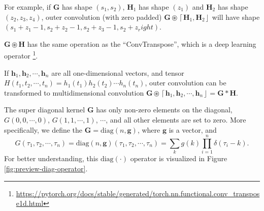 \documentclass[twoside,11pt]{article}
\def\oconv{\circledast}
\def\diag{\text{diag}}
\def\tvar#1{\mathbf{#1}} %
\def\lcerfl#1{\left\lceil{#1}\right\rfloor}
\begin{document}
For example, if \(\tvar{G}\) has shape \((s_1, s_2)\), \(\tvar{H}_1\) has shape \((z_1)\) and \(\tvar{H}_2\) has shape \((z_2, z_3, z_4)\), outer convolution (with zero padded) \(\tvar{G} \oconv \lcerfl{\tvar{H}_1, \tvar{H}_2}\) will have shape
\(( s_1 + z_1 - 1, s_2 + z_2 - 1, s_2 + z_3 - 1, s_2 + z_right)\).

\begin{remark}
  \(\tvar{G} \oconv \tvar{H}\) has the same operation as the ``ConvTranspose'', which is a deep learning operator \footnote{\url{https://pytorch.org/docs/stable/generated/torch.nn.functional.conv_transpose1d.html}}.
\end{remark}

\begin{remark}
  If \(\tvar{h}_1, \tvar{h}_2, \cdots, \tvar{h}_n\) are all one-dimensional vectors, and tensor \(H(t_1, t_2, \cdots, t_n) = h_1(t_1) h_2(t_2) \cdots h_n(t_n)\), outer convolution can be transformed to multidimensional convolution \(\tvar{G} \oconv \lcerfl{\tvar{h}_1, \tvar{h}_2, \cdots, \tvar{h}_n} = \tvar{G} * \tvar{H}\).
\end{remark}


The super diagonal kernel \(\tvar{G}\) has only non-zero elements on the diagonal, \(G(0, 0, \cdots, 0)\), \(G(1, 1, \cdots, 1)\), \(\cdots\), and all other elements are set to zero.
More specifically, we define the \(\tvar{G} = \diag(n, \tvar{g})\), where \(\tvar{g}\) is a vector, and
\begin{equation}
  \label{equ:briefly-diag-operator}
  G(\tau_1, \tau_2, \cdots, \tau_n)
  = \diag(n, \tvar{g})(\tau_1, \tau_2, \cdots, \tau_n)
  = \sum_{k} g(k) \prod_{i=1}^{n} \delta(\tau_i - k).
\end{equation}
For better understanding, this \(\diag(\cdot)\) operator is visualized in Figure \ref{fig:preview-diag-operator}.
\end{document}
